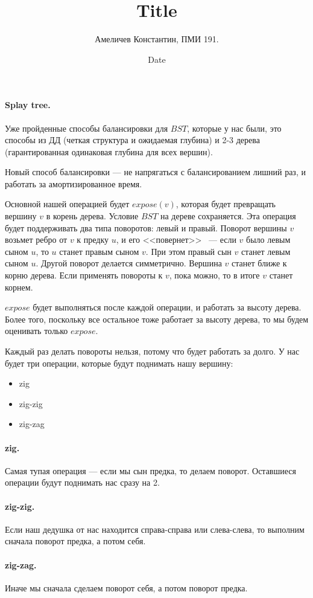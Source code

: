 \documentclass[12pt]{article}
\title{Title}
\author{Амеличев Константин, ПМИ 191.}
\date{Date}
\begin{document}
\paragraph{Splay tree.}

Уже пройденные способы балансировки для $BST$, которые у нас были, это способы из ДД (четкая структура и ожидаемая глубина) и 2-3 дерева (гарантированная одинаковая глубина для всех вершин).

Новый способ балансировки --- не напрягаться с балансированием лишний раз, и работать за амортизированное время.

Основной нашей операцией будет $expose(v)$, которая будет превращать вершину $v$ в корень дерева. Условие $BST$ на дереве сохраняется. Эта операция будет поддерживать два типа поворотов: левый и правый. Поворот вершины $v$ возьмет ребро от $v$ к предку $u$, и его <<повернет>> ~--- если $v$ было левым сыном $u$, то $u$ станет правым сыном $v$. При этом правый сын $v$ станет левым сыном $u$. Другой поворот делается симметрично. Вершина $v$ станет ближе к корню дерева. Если применять повороты к $v$, пока можно, то в итоге $v$ станет корнем.

$expose$ будет выполняться после каждой операции, и работать за высоту дерева. Более того, поскольку все остальное тоже работает за высоту дерева, то мы будем оценивать только $expose$.

Каждый раз делать повороты нельзя, потому что будет работать за долго. У нас будет три операции, которые будут поднимать нашу вершину:
\begin{itemize}
\item zig
\item zig-zig
\item zig-zag
\end{itemize}

\paragraph{zig.} Самая тупая операция --- если мы сын предка, то делаем поворот. Оставшиеся операции будут поднимать нас сразу на 2.

\paragraph{zig-zig.} Если наш дедушка от нас находится справа-справа или слева-слева, то выполним сначала поворот предка, а потом себя. 

\paragraph{zig-zag.} Иначе мы сначала сделаем поворот себя, а потом поворот предка.
\end{document}
